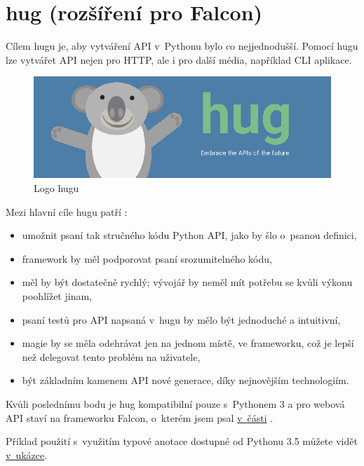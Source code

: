 \section{\texorpdfstring{hug (rozšíření pro Falcon) \label{hug}}{hug (rozšíření pro Falcon) }}\label{hug-rozux161uxedux159enuxed-pro-falcon}

Cílem hugu je, aby vytváření API v~Pythonu bylo co nejjednodušší. Pomocí hugu lze vytvářet API nejen pro HTTP, ale i pro další média, například CLI aplikace. \autocite{hugweb}

\begin{figure}
\centering
\includegraphics{images/hug}
\caption{Logo hugu \autocite{hugpic}\label{pic:hug}}
\end{figure}

Mezi hlavní cíle hugu patří \autocite{huggithub}:

\begin{itemize}
\tightlist
\item
  umožnit psaní tak stručného kódu Python API, jako by šlo o~psanou definici,
\item
  framework by měl podporovat psaní srozumitelného kódu,
\item
  měl by být dostatečně rychlý; vývojář by neměl mít potřebu se kvůli výkonu poohlížet jinam,
\item
  psaní testů pro API napsaná v~hugu by mělo být jednoduché a intuitivní,
\item
  magie by se měla odehrávat jen na jednom místě, ve frameworku, což je lepší než delegovat tento problém na uživatele,
\item
  být základním kamenem API nové generace, díky nejnovějším technologiím.
\end{itemize}

Kvůli poslednímu bodu je hug kompatibilní pouze s~Pythonem 3 a pro webová API staví na frameworku Falcon, o~kterém jsem psal \protect\hyperlink{falcon}{v~části} \autocite{huggithub}.

Příklad použití s~využitím typové anotace dostupné od Pythonu 3.5 můžete vidět \protect\hyperlink{code:hug}{v~ukázce}.

